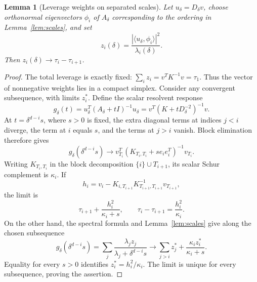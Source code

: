 \documentclass[11pt]{article}
\newtheorem{lemma}{Lemma}
\begin{document}
\begin{lemma}[Leverage weights on separated scales]\label{lem:weights}
Let $u_\delta=D_\delta v$, choose orthonormal eigenvectors $\phi_i$ of
$A_\delta$ corresponding to the ordering in Lemma~\ref{lem:scales},
and set
\[
 z_i(\delta)=\frac{|\langle u_\delta,\phi_i\rangle|^2}{\lambda_i(\delta)}.
\]
Then $z_i(\delta)\to\tau_i-\tau_{i+1}$.
\end{lemma}
\begin{proof}
The total leverage is exactly fixed:
$\sum_i z_i=v^TK^{-1}v=\tau_1$. Thus the vector of nonnegative weights
lies in a compact simplex. Consider any convergent subsequence,
with limits $z_i^*$. Define the scalar resolvent response
\[
 g_\delta(t)=u_\delta^T(A_\delta+tI)^{-1}u_\delta
           =v^T(K+tD_\delta^{-2})^{-1}v.
\]
At $t=\delta^{d-i}s$, where $s>0$ is fixed, the extra diagonal terms
at indices $j<i$ diverge, the term at $i$ equals $s$, and the terms
at $j>i$ vanish. Block elimination therefore gives
\[
 g_\delta(\delta^{d-i}s)
 \longrightarrow
 v_{T_i}^T(K_{T_i,T_i}+s e_ie_i^T)^{-1}v_{T_i}.
\]
Writing $K_{T_i,T_i}$ in the block decomposition $\{i\}\cup T_{i+1}$,
its scalar Schur complement is $\kappa_i$. If
\[
 h_i=v_i-K_{i,T_{i+1}}K_{T_{i+1},T_{i+1}}^{-1}v_{T_{i+1}},
\]
the limit is
\[
 \tau_{i+1}+\frac{h_i^2}{\kappa_i+s},\qquad
 \tau_i-\tau_{i+1}=\frac{h_i^2}{\kappa_i}.
\]
On the other hand, the spectral formula and Lemma~\ref{lem:scales}
give along the chosen subsequence
\[
 g_\delta(\delta^{d-i}s)
   =\sum_j\frac{\lambda_j z_j}{\lambda_j+\delta^{d-i}s}
   \longrightarrow\sum_{j>i}z_j^*
                      +\frac{\kappa_i z_i^*}{\kappa_i+s}.
\]
Equality for every $s>0$ identifies $z_i^*=h_i^2/\kappa_i$.
The limit is unique for every subsequence, proving the assertion.
\end{proof}
\end{document}

